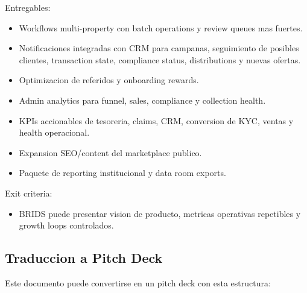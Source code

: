 \documentclass[
  10pt,
  letterpaper,
]{article}
\providecommand{\tightlist}{%
  \setlength{\itemsep}{0pt}\setlength{\parskip}{0pt}}
\begin{document}
Entregables:

\begin{itemize}
\tightlist
\item
  Workflows multi-property con batch operations y review queues mas
  fuertes.
\item
  Notificaciones integradas con CRM para campanas, seguimiento de
  posibles clientes, transaction state, compliance status, distributions
  y nuevas ofertas.
\item
  Optimizacion de referidos y onboarding rewards.
\item
  Admin analytics para funnel, sales, compliance y collection health.
\item
  KPIs accionables de tesoreria, claims, CRM, conversion de KYC, ventas
  y health operacional.
\item
  Expansion SEO/content del marketplace publico.
\item
  Paquete de reporting institucional y data room exports.
\end{itemize}

Exit criteria:

\begin{itemize}
\tightlist
\item
  BRIDS puede presentar vision de producto, metricas operativas
  repetibles y growth loops controlados.
\end{itemize}

\subsection{Traduccion a Pitch Deck}\label{traduccion-a-pitch-deck}

Este documento puede convertirse en un pitch deck con esta estructura:
\end{document}
